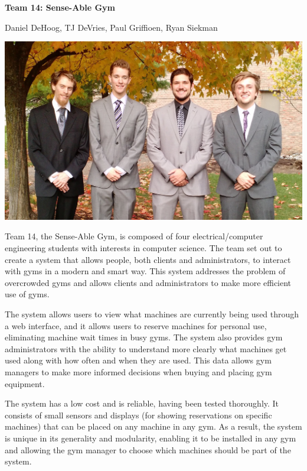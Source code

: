 \documentclass[letterpaper,11pt]{./templates/texMemo} %
\begin{document}
\centerline{\Huge{\textbf{Team 14: Sense-Able Gym}}}
\centerline{\LARGE{Daniel DeHoog, TJ DeVries, Paul Griffioen, Ryan Siekman}}

\centerline{\includegraphics[width=\textwidth]{Team.jpg}}

Team 14, the Sense-Able Gym, is composed of four electrical/computer engineering students with interests in computer science. The team set out to create a system that allows people, both clients and administrators, to interact with gyms in a modern and smart way. This system addresses the problem of overcrowded gyms and allows clients and administrators to make more efficient use of gyms.

The system allows users to view what machines are currently being used through a web interface, and it allows users to reserve machines for personal use, eliminating machine wait times in busy gyms. The system also provides gym administrators with the ability to understand more clearly what machines get used along with how often and when they are used. This data allows gym managers to make more informed decisions when buying and placing gym equipment.

The system has a low cost and is reliable, having been tested thoroughly. It consists of small sensors and displays (for showing reservations on specific machines) that can be placed on any machine in any gym. As a result, the system is unique in its generality and modularity, enabling it to be installed in any gym and allowing the gym manager to choose which machines should be part of the system.
\end{document}
